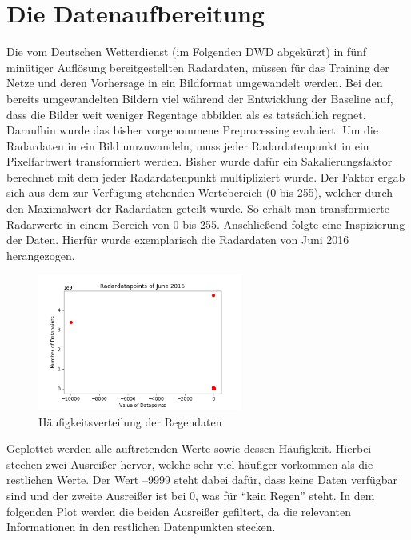 \section{Die Datenaufbereitung}\label{die datenaufbereitung}
Die vom Deutschen Wetterdienst (im Folgenden DWD abgekürzt) in fünf minütiger Auflösung bereitgestellten Radardaten, müssen für das Training der Netze und deren Vorhersage in ein Bildformat umgewandelt werden.
Bei den bereits umgewandelten Bildern viel während der Entwicklung der Baseline auf, dass die Bilder weit weniger Regentage abbilden als es tatsächlich regnet. Daraufhin wurde das bisher vorgenommene Preprocessing evaluiert. Um die Radardaten in ein Bild umzuwandeln, muss jeder Radardatenpunkt in ein Pixelfarbwert transformiert werden. Bisher wurde dafür ein Sakalierungsfaktor berechnet mit dem jeder Radardatenpunkt multipliziert wurde. Der Faktor ergab sich aus dem zur Verfügung stehenden Wertebereich (0 bis 255), welcher durch den Maximalwert der Radardaten geteilt wurde. So erhält man transformierte Radarwerte in einem Bereich von 0 bis 255.
Anschließend folgte eine Inspizierung der Daten. Hierfür wurde exemplarisch die Radardaten von Juni 2016 herangezogen.

\begin{figure}[h]
 \centering
 \includegraphics[width=0.6\textwidth,angle=0]{abb/Radardatapoints_of_June_2016}
 \caption[Datenaufbereitung]{Häufigkeitsverteilung der Regendaten}
\label{fig:datenaufbereitung}
\end{figure}

Geplottet werden alle auftretenden Werte sowie dessen Häufigkeit. Hierbei stechen zwei Ausreißer hervor, welche sehr viel häufiger vorkommen als die restlichen Werte. Der Wert –9999 steht dabei dafür, dass keine Daten verfügbar sind und der zweite Ausreißer ist bei 0, was für “kein Regen” steht. In dem folgenden Plot werden die beiden Ausreißer gefiltert, da die relevanten Informationen in den restlichen Datenpunkten stecken.

